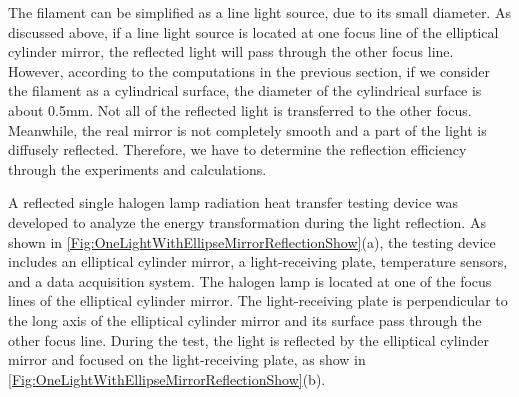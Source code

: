 
The filament can be simplified as a line light source, due to its small diameter. As discussed above, if a line light source is located at one focus line of the elliptical cylinder mirror, the reflected light will pass through the other focus line.
However, according to the computations in the previous section, if we consider the filament as a cylindrical surface, the diameter of the cylindrical surface is about 0.5mm. Not all of the reflected light is transferred to the other focus.
Meanwhile, the real mirror is not completely smooth and a part of the light is diffusely reflected. Therefore, we have to determine the reflection efficiency through the experiments and calculations.

A reflected single halogen lamp radiation heat transfer testing device was developed to analyze the energy transformation during the light reflection.
As shown in \ref{Fig:OneLightWithEllipseMirrorReflectionShow}(a), the testing
device includes an elliptical cylinder mirror, a light-receiving plate, temperature sensors, and a data acquisition system.
The halogen lamp is located at one of the focus lines of the elliptical cylinder mirror. The light-receiving plate is perpendicular to the long axis of the elliptical cylinder mirror and its surface pass through the other focus line. During the test, the light is reflected by the elliptical cylinder mirror and focused on the light-receiving plate, as show in \ref{Fig:OneLightWithEllipseMirrorReflectionShow}(b).

